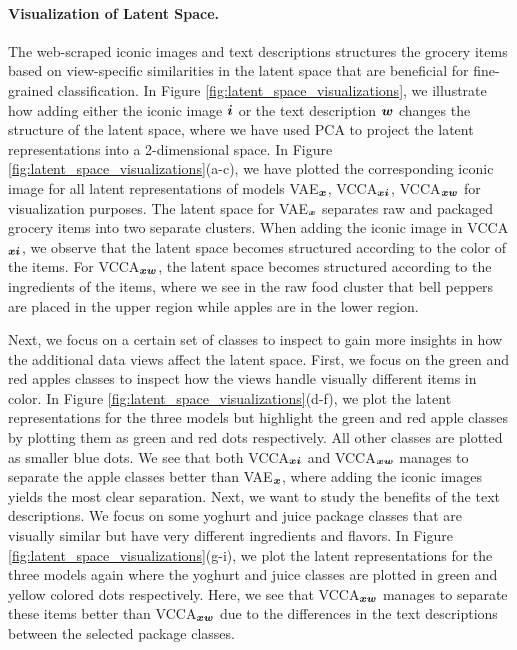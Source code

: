 \vspace{-3mm}
\paragraph{Visualization of Latent Space.} The web-scraped iconic images and text descriptions structures the grocery items based on view-specific similarities in the latent space that are beneficial for fine-grained classification. In Figure \ref{fig:latent_space_visualizations}, we illustrate how adding either the iconic image ${\bm{i}}$ or the text description ${\bm{w}}$ changes the structure of the latent space, where we have used PCA to project the latent representations into a 2-dimensional space. In Figure \ref{fig:latent_space_visualizations}(a-c), we have plotted the corresponding iconic image for all latent representations of models VAE$_{{\bm{x}}}$, VCCA$_{{\bm{x}} {\bm{i}}}$, VCCA$_{{\bm{x}} {\bm{w}}}$ for visualization purposes. The latent space for VAE$_{{\bm{x}}}$ separates raw and packaged grocery items into two separate clusters. When adding the iconic image in VCCA$_{{\bm{x}} {\bm{i}}}$, we observe that the latent space becomes structured according to the color of the items. For VCCA$_{{\bm{x}} {\bm{w}}}$, the latent space becomes structured according to the ingredients of the items, where we see in the raw food cluster that bell peppers are placed in the upper region while apples are in the lower region. 

Next, we focus on a certain set of classes to inspect to gain more insights in how the additional data views affect the latent space. First, we focus on the green and red apples classes to inspect how the views handle visually different items in color. In Figure \ref{fig:latent_space_visualizations}(d-f), we plot the latent representations for the three models but highlight the green and red apple classes by plotting them as green and red dots respectively. All other classes are plotted as smaller blue dots. We see that both VCCA$_{{\bm{x}} {\bm{i}}}$ and VCCA$_{{\bm{x}} {\bm{w}}}$ manages to separate the apple classes better than VAE$_{{\bm{x}}}$, where adding the iconic images yields the most clear separation. Next, we want to study the benefits of the text descriptions. We focus on some yoghurt and juice package classes that are visually similar but have very different ingredients and flavors. In Figure \ref{fig:latent_space_visualizations}(g-i), we plot the latent representations for the three models again where the yoghurt and juice classes are plotted in green and yellow colored dots respectively. Here, we see that VCCA$_{{\bm{x}} {\bm{w}}}$ manages to separate these items better than VCCA$_{{\bm{x}} {\bm{w}}}$ due to the differences in the text descriptions between the selected package classes. 

